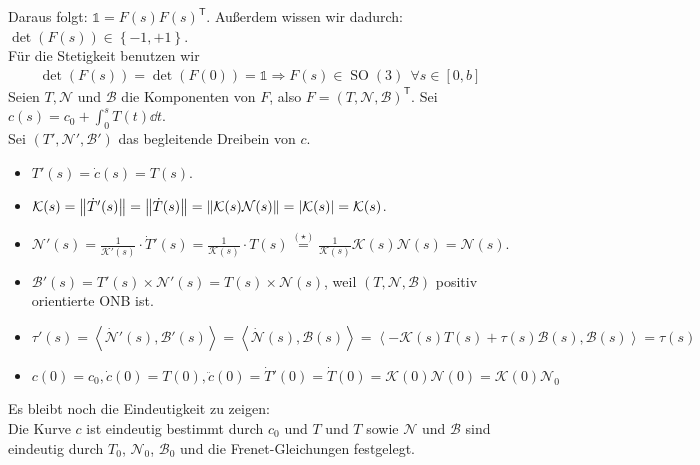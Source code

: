\begin{bew}
Daraus folgt: $\mathds{1} = F(s)F(s)^{\mathsf{T}}$. Außerdem wissen wir dadurch: $\operatorname{det}(F(s)) \in \left\{-1, +1\right\}$. \\
Für die Stetigkeit benutzen wir 
\begin{align*}
\operatorname{det}(F(s)) = \operatorname{det}(F(0)) = \mathds{1} \Rightarrow F(s) \in \operatorname{SO}(3) \ \ \forall s \in [0,b]
\end{align*}
Seien $T, \mathcal{N}$ und $\mathcal{B}$ die Komponenten von $F$, also $F=\left(T,\mathcal{N},\mathcal{B}\right)^{\mathsf{T}}$. 
Sei $c(s) = c_0 + \int_0^s T(t) \dd t$. \\
Sei $(T',\mathcal{N}',\mathcal{B}')$ das begleitende Dreibein von $c$.
\begin{itemize}
	\item $T'(s) = \dot{c}(s) = T(s)$.
	\item $\mathcal{K}(s) = \norm{\dot{T}'(s)}= \norm{\dot{T}(s)} = \norm{\mathcal{K}(s)\mathcal{N}(s)} = \abs{\mathcal{K}(s)} = \mathcal{K}(s)$.
	\item $\mathcal{N}'(s) = \frac{1}{\mathcal{K}'(s)}\cdot\dot{T}'(s) = \frac{1}{\mathcal{K}(s)} \cdot T(s) \overset{(\star)}{=} \frac{1}{\mathcal{K}(s)}\mathcal{K}(s)\mathcal{N}(s) = \mathcal{N}(s)$.
	\item $\mathcal{B}'(s) = T'(s) \times \mathcal{N}'(s) = T(s) \times \mathcal{N}(s)$, weil $\left(T,\mathcal{N},\mathcal{B}\right)$ positiv orientierte ONB ist.
	\item $\tau'(s) = \left<\dot{\mathcal{N}}'(s),\mathcal{B}'(s)\right> = \left<\dot{\mathcal{N}}(s),\mathcal{B}(s)\right> = \left<-\mathcal{K}(s)T(s)+\tau(s)\mathcal{B}(s),\mathcal{B}(s)\right> = \tau(s)$
	\item $c(0) = c_0, \dot{c}(0) = T(0), \ddot{c}(0) = \dot{T}'(0) =\dot{T}(0) = \mathcal{K}(0)\mathcal{N}(0)= \mathcal{K}(0)\mathcal{N}_0$
\end{itemize}




Es bleibt noch die Eindeutigkeit zu zeigen: \\

Die Kurve $c$ ist eindeutig bestimmt durch $c_0$ und $T$ und $T$ sowie $\mathcal{N}$ und $\mathcal{B}$ sind eindeutig durch $T_0$, $\mathcal{N}_0$, $\mathcal{B}_0$ und die Frenet-Gleichungen festgelegt.
\end{bew}


